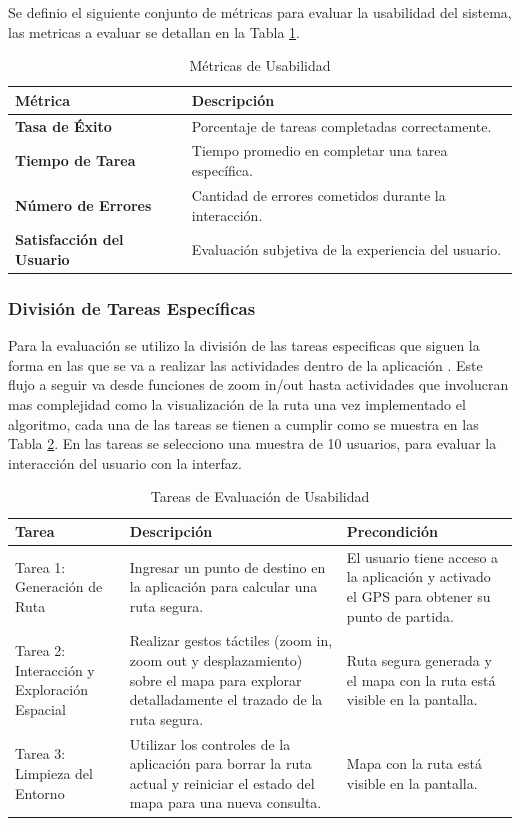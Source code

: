 Se definio el siguiente conjunto de métricas para evaluar la usabilidad del sistema, las metricas a evaluar se detallan en la Tabla \ref{tab:metricas_usabilidad}.

\begin{longtable}{|p{4cm}|p{10cm}|}
\caption{Métricas de Usabilidad}\label{tab:metricas_usabilidad}\\
\hline
\textbf{Métrica} & \textbf{Descripción} \\ \hline
\textbf{Tasa de Éxito} & Porcentaje de tareas completadas correctamente. \\ \hline
\textbf{Tiempo de Tarea} & Tiempo promedio en completar una tarea específica. \\ \hline
\textbf{Número de Errores} & Cantidad de errores cometidos durante la interacción. \\ \hline
\textbf{Satisfacción del Usuario} & {\raggedright Evaluación subjetiva de la experiencia del usuario.} \\ \hline
\end{longtable}

\subsubsection{División de Tareas Específicas}
Para la evaluación se utilizo la división de las tareas especificas que siguen la forma en las que se va a realizar las actividades dentro de la aplicación \cite{rubin2008handbook}. Este flujo a seguir va desde funciones de zoom in/out hasta actividades que involucran mas complejidad como la visualización de la ruta una vez implementado el algoritmo, cada una de las tareas se tienen a cumplir como se muestra en las Tabla \ref{tab:tareas_especificas}. En las tareas se selecciono una muestra de 10 usuarios, para evaluar la interacción del usuario con la interfaz.

\begin{table}
\caption{Tareas de Evaluación de Usabilidad}\label{tab:tareas_especificas}
\begin{tabular}{|p{3.5cm}|p{6.5cm}|p{4cm}|}
\hline
\textbf{Tarea} & \textbf{Descripción} & \textbf{Precondición} \\ \hline
Tarea 1: Generación de Ruta & Ingresar un punto de destino en la aplicación para calcular una ruta segura. & El usuario tiene acceso a la aplicación y activado el GPS para obtener su punto de partida. \\\hline
Tarea 2: Interacción y Exploración Espacial &  Realizar gestos táctiles (zoom in, zoom out y desplazamiento) sobre el mapa para explorar detalladamente el trazado de la ruta segura. & Ruta segura generada y el mapa con la ruta está visible en la pantalla. \\\hline
Tarea 3: Limpieza del Entorno & Utilizar los controles de la aplicación para borrar la ruta actual y reiniciar el estado del mapa para una nueva consulta. & Mapa con la ruta está visible en la pantalla. \\\hline
\end{tabular}
\end{table}

